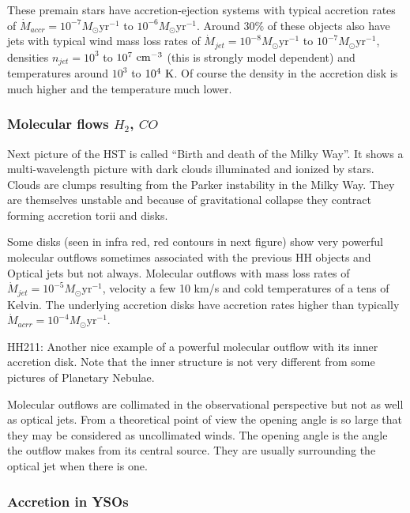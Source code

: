 \documentclass[10pt,a4paper,english]{article}
\begin{document}
These premain stars have accretion-ejection systems with typical accretion
rates of $\dot{M}_{accr}=10^{-7}M_{\odot}\mathrm{yr^{-1}}$ to $10^{-6}M_{\odot} \mathrm{yr^{-1}}$.
Around $30\%$ of these objects also have jets with typical wind mass loss rates
of $\dot{M}_{jet}=10^{-8}M_{\odot}\mathrm{yr^{-1}}$ to $10^{-7}M_{\odot}\mathrm{yr^{-1}}$, densities
$n_{jet}=10^3$ to $10^7\ \mathrm{cm^{-3}}$ (this is strongly model dependent) and
temperatures around $10^3$ to $10^4 \ \mathrm{K}$. Of course the density in the accretion
disk is much higher and the temperature much lower.

\subsubsection{\texorpdfstring{Molecular flows $H_2$, $CO$}{Molecular flows H2, CO}}

Next picture of the HST is called ``Birth and death of the Milky Way''. It shows
a multi-wavelength picture with dark clouds illuminated and ionized by stars.
Clouds are clumps resulting from the Parker instability in the Milky Way. They
are themselves unstable and because of gravitational collapse they contract
forming accretion torii and disks.

Some disks (seen in infra red, red contours in next figure) show very powerful
molecular outflows sometimes associated with the previous HH objects and
Optical jets but not always. Molecular outflows with mass loss rates of
$\dot{M}_{jet}=10^{-5}M_{\odot}\mathrm{yr^{-1}}$, velocity a few 10 km/s and cold
temperatures of a tens of Kelvin. The underlying accretion disks have accretion
rates higher than typically $\dot{M}_{acrr}=10^{-4}M_{\odot}\mathrm{yr^{-1}}$.

HH211: Another nice example of a powerful molecular outflow with its inner
accretion disk. Note that the inner structure is not very different from some
pictures of Planetary Nebulae.

Molecular outflows are collimated in the observational perspective but not as
well as optical jets. From a theoretical point of view the opening angle is so
large that they may be considered as uncollimated winds. The opening angle is
the angle the outflow makes from its central source. They are usually
surrounding the optical jet when there is one.

\subsubsection{Accretion in YSOs}
\end{document}
